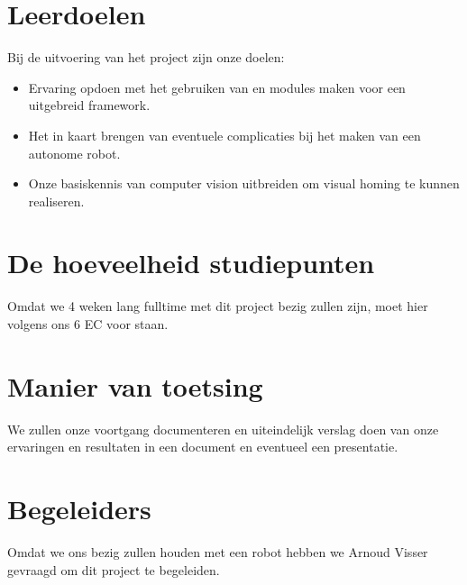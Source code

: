\documentclass[a4paper,10pt]{article}
\begin{document}
\section{Leerdoelen}
Bij de uitvoering van het project zijn onze doelen:
\begin{itemize}
\item Ervaring opdoen met het gebruiken van en modules maken voor een uitgebreid framework. %
\item Het in kaart brengen van eventuele complicaties bij het maken van een autonome robot.
\item Onze basiskennis van computer vision uitbreiden om visual homing te kunnen realiseren.
\end{itemize}

\section{De hoeveelheid studiepunten}
Omdat we 4 weken lang fulltime met dit project bezig zullen zijn, moet hier volgens ons 6 EC voor staan.

\section{Manier van toetsing}
We zullen onze voortgang documenteren en uiteindelijk verslag doen van onze ervaringen en resultaten in een document en eventueel een presentatie.

\section{Begeleiders}
Omdat we ons bezig zullen houden met een robot hebben we Arnoud Visser gevraagd om dit project te begeleiden. 
\end{document}
